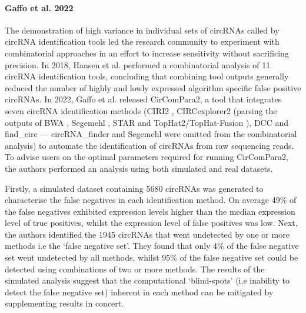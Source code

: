 \paragraph*{Gaffo et al. 2022}
The demonstration of high variance in individual sets of circRNAs called by circRNA identification tools \cite{Hansen2016Apr,Zeng2017Jun} led the research community to experiment with combinatorial approaches in an effort to increase sensitivity without sacrificing precision. In 2018, Hansen et al. \cite{Hansen2018} performed a combinatorial analysis of 11 circRNA identification tools, concluding that combining tool outputs generally reduced the number of highly and lowly expressed algorithm specific false positive circRNAs. In 2022, Gaffo et al. \cite{CirComPara2} released CirComPara2, a tool that integrates seven circRNA identification methods (CIRI2 \cite{CIRI2}, CIRCexplorer2 \cite{CIRCexplorer2} (parsing the outputs of BWA \cite{BWA}, Segemehl \cite{segemehl}, STAR \cite{STAR} and TopHat2/TopHat-Fusion \cite{TopHat2,TopHatFusion}), DCC \cite{DCC} and find\_circ \cite{findcirc} --- circRNA\_finder \cite{circRNAfinder} and Segemehl \cite{segemehl} were omitted from the combinatorial analysis) to automate the identification of circRNAs from raw sequencing reads. To advise users on the optimal parameters required for running CirComPara2, the authors performed an analysis using both simulated and real datasets. \par

Firstly, a simulated dataset containing 5680 circRNAs was generated to characterise the false negatives in each identification method. On average 49\% of the false negatives exhibited expression levels higher than the median expression level of true positives, whilst the expression level of false positives was low. Next, the authors identified the 1945 circRNAs that went undetected by one or more methods i.e the `false negative set'. They found that only 4\% of the false negative set went undetected by all methods, whilst 95\% of the false negative set could be detected using combinations of two or more methods. The results of the simulated analysis suggest that the computational `blind-spots' (i.e inability to detect the false negative set) inherent in each method can be mitigated by supplementing results in concert. \par

